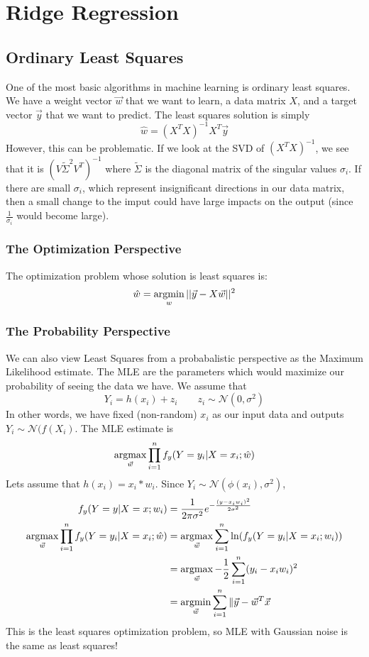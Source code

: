 \section{Ridge Regression}
\subsection{Ordinary Least Squares}
One of the most basic algorithms in machine learning is ordinary least squares. We have a weight vector $\vec{w}$ that we want to learn, a data matrix $X$, and a target vector $\vec{y}$ that we want to predict. 
The least squares solution is simply
\[
  \hat{w} = (X^TX)^{-1}X^T\vec{y}
\]
However, this can be problematic. If we look at the SVD of $(X^TX)^{-1}$, we see that it is $(V\tilde{\Sigma}^2V^T)^{-1}$ where $\tilde{\Sigma}$ is the diagonal matrix of the singular values $\sigma_i$. If there are small $\sigma_i$, which represent insignificant directions in our data matrix, then a small change to the imput could have large impacts on the output (since $\frac{1}{\sigma_i}$ would become large).
\subsubsection{The Optimization Perspective}
The optimization problem whose solution is least squares is:
\[
  \hat{w} = \operatorname*{argmin}_{w} ||\vec{y} - X\vec{w}||^2
\]
\subsubsection{The Probability Perspective}
We can also view Least Squares from a probabalistic perspective as the Maximum Likelihood estimate. The MLE are the parameters which would maximize our probability of seeing the data we have. We assume that $$Y_i = h(x_i)+z_i\qquad z_i\sim \mathcal{N}(0, \sigma^2)$$
In other words, we have fixed (non-random) $x_i$ as our input data and outputs $Y_i\sim\mathcal{N}(f(X_i)$. The MLE estimate is $$\operatorname*{argmax}_{\vec{w}}\prod_{i=1}^nf_y(Y=y_i|X=x_i;\hat{w})$$
Lets assume that $h(x_i) = x_i * w_i$. Since $Y_i\sim\mathcal{N}(\phi(x_i), \sigma^2)$,
\begin{align*}
f_y(Y=y|X=x; w_i) &= \frac{1}{2\pi\sigma^2}e^{-\frac{(y-x_iw_i)^2}{2\sigma^2}}\\
\operatorname*{argmax}_{\vec{w}}\prod_{i=1}^nf_y(Y=y_i|X=x_i;\hat{w}) &= \operatorname*{argmax}_{\vec{w}}\sum_{i=1}^{n}\ln(f_y(Y=y_i|X=x_i; w_i))\\
&= \operatorname*{argmax}_{\vec{w}}-\frac{1}{2}\sum_{i=1}^n(y_i-x_iw_i)^2\\
&= \operatorname*{argmin}_{\vec{w}}\sum_{i=1}^n\|\vec{y}-\vec{w}^T\vec{x}
\end{align*}
This is the least squares optimization problem, so MLE with Gaussian noise is the same as least squares!
